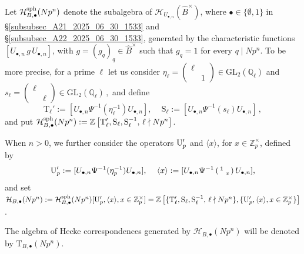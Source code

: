 \documentclass{amsart}
\numberwithin{equation}{section}
\newcommand{\QQ}{\mathbb{Q}}
\newcommand{\ZZ}{\mathbb{Z}}
\newcommand{\GL}{\mathrm{GL}}
\begin{document}
Let $\mathcal{H}_{B,\bullet}^{\rm sph}(Np^n)$ denote the subalgebra of $\mathcal{H}_{U_{\bullet,n}}( \widehat{B}^\times)$, where $\bullet \in \{\emptyset,  1\}$ in \S\ref{subsubsec_A21_2025_06_30_1533} and \S\ref{subsubsec_A22_2025_06_30_1533}, generated by the characteristic functions $[U_{\bullet,n}\, g\, U_{\bullet,n}]$, with $g = ( g_q)_q \in \widehat{B}^\times$ such that $g_q = 1$ for every $q \mid Np^n$. To be more precise, for a prime $\ell$ let us consider 
 $\eta_\ell = \left (\begin{smallmatrix}
     \ell & \\ & 1
 \end{smallmatrix} \right) \in \GL_2(\QQ_\ell)$ and $s_\ell =  \left (\begin{smallmatrix}
     \ell & \\ & \ell
 \end{smallmatrix} \right) \in \GL_2(\QQ_\ell)\,,$ 
 and define \[\mathrm{T}_\ell':= [U_{\bullet,n} \Psi^{-1}(\eta_\ell^{-1}) U_{\bullet,n} ],\,\quad \mathrm{S}_\ell:= [U_{\bullet,n}\Psi^{-1}(s_\ell) U_{\bullet,n} ]\,,\]
and put $\mathcal{H}_{B,\bullet}^{\rm sph}(Np^n) := \ZZ \left[ \mathrm{T}_\ell', \mathrm{S}_\ell, \mathrm{S}_\ell^{-1},\, \ell \nmid Np^n \right]$.

When $n >0$, we further consider the operators ${\rm U}_p'$ and $\langle x \rangle$, for $x \in \ZZ_p^\times$, defined by 
\[{\rm U}_p':= [U_{\bullet,n} \Psi^{-1}(\eta_p^{-1}) U_{\bullet,n} ],\,\quad \langle x \rangle:= [U_{\bullet,n} \Psi^{-1}\left( \begin{smallmatrix}
    1 & \\ & x
\end{smallmatrix}\right) U_{\bullet,n} ], \]
and set $\mathcal{H}_{B,\bullet}(Np^n) : = \mathcal{H}_{B,\bullet}^{\rm sph}(Np^n)[{\rm U}_p',  \langle x \rangle, x \in \ZZ_p^\times  ] = \ZZ \left[\{ \mathrm{T}_\ell', \mathrm{S}_\ell, \mathrm{S}_\ell^{-1},\, \ell \nmid Np^n \}, \{ {\rm U}_p',  \langle x \rangle, x \in \ZZ_p^\times\} \right]$.

\noindent The algebra of Hecke correspondences generated by $\mathcal{H}_{B,\bullet}(Np^n)$ will be denoted by $\mathrm{T}_{B,\bullet}(Np^n)$.
\end{document}
